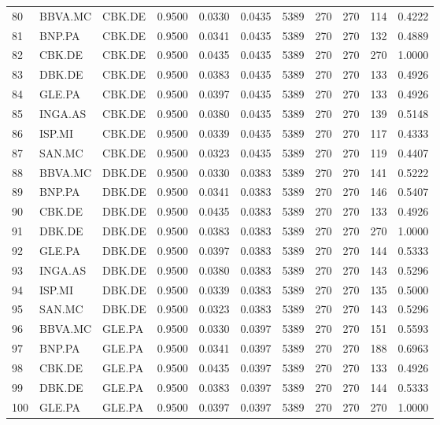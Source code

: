 \begin{table}
\begin{tabular}{lllrrrrrrrr}
80 & BBVA.MC & CBK.DE & 0.9500 & 0.0330 & 0.0435 & 5389 & 270 & 270 & 114 & 0.4222 \\
81 & BNP.PA & CBK.DE & 0.9500 & 0.0341 & 0.0435 & 5389 & 270 & 270 & 132 & 0.4889 \\
82 & CBK.DE & CBK.DE & 0.9500 & 0.0435 & 0.0435 & 5389 & 270 & 270 & 270 & 1.0000 \\
83 & DBK.DE & CBK.DE & 0.9500 & 0.0383 & 0.0435 & 5389 & 270 & 270 & 133 & 0.4926 \\
84 & GLE.PA & CBK.DE & 0.9500 & 0.0397 & 0.0435 & 5389 & 270 & 270 & 133 & 0.4926 \\
85 & INGA.AS & CBK.DE & 0.9500 & 0.0380 & 0.0435 & 5389 & 270 & 270 & 139 & 0.5148 \\
86 & ISP.MI & CBK.DE & 0.9500 & 0.0339 & 0.0435 & 5389 & 270 & 270 & 117 & 0.4333 \\
87 & SAN.MC & CBK.DE & 0.9500 & 0.0323 & 0.0435 & 5389 & 270 & 270 & 119 & 0.4407 \\
88 & BBVA.MC & DBK.DE & 0.9500 & 0.0330 & 0.0383 & 5389 & 270 & 270 & 141 & 0.5222 \\
89 & BNP.PA & DBK.DE & 0.9500 & 0.0341 & 0.0383 & 5389 & 270 & 270 & 146 & 0.5407 \\
90 & CBK.DE & DBK.DE & 0.9500 & 0.0435 & 0.0383 & 5389 & 270 & 270 & 133 & 0.4926 \\
91 & DBK.DE & DBK.DE & 0.9500 & 0.0383 & 0.0383 & 5389 & 270 & 270 & 270 & 1.0000 \\
92 & GLE.PA & DBK.DE & 0.9500 & 0.0397 & 0.0383 & 5389 & 270 & 270 & 144 & 0.5333 \\
93 & INGA.AS & DBK.DE & 0.9500 & 0.0380 & 0.0383 & 5389 & 270 & 270 & 143 & 0.5296 \\
94 & ISP.MI & DBK.DE & 0.9500 & 0.0339 & 0.0383 & 5389 & 270 & 270 & 135 & 0.5000 \\
95 & SAN.MC & DBK.DE & 0.9500 & 0.0323 & 0.0383 & 5389 & 270 & 270 & 143 & 0.5296 \\
96 & BBVA.MC & GLE.PA & 0.9500 & 0.0330 & 0.0397 & 5389 & 270 & 270 & 151 & 0.5593 \\
97 & BNP.PA & GLE.PA & 0.9500 & 0.0341 & 0.0397 & 5389 & 270 & 270 & 188 & 0.6963 \\
98 & CBK.DE & GLE.PA & 0.9500 & 0.0435 & 0.0397 & 5389 & 270 & 270 & 133 & 0.4926 \\
99 & DBK.DE & GLE.PA & 0.9500 & 0.0383 & 0.0397 & 5389 & 270 & 270 & 144 & 0.5333 \\
100 & GLE.PA & GLE.PA & 0.9500 & 0.0397 & 0.0397 & 5389 & 270 & 270 & 270 & 1.0000 \\

\end{tabular}
\end{table}

